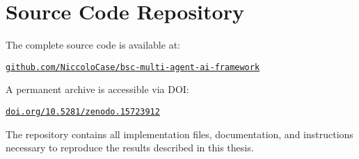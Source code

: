 \section*{Source Code Repository}
\noindent The complete source code is available at:
\begin{center}
\href{https://github.com/NiccoloCase/bsc-multi-agent-ai-framework}{\texttt{github.com/NiccoloCase/bsc-multi-agent-ai-framework}}
\end{center}

\noindent A permanent archive is accessible via DOI:
\begin{center}
\href{https://doi.org/10.5281/zenodo.15723912}{\texttt{doi.org/10.5281/zenodo.15723912}}
\end{center}

\noindent The repository contains all implementation files, documentation, and instructions necessary to reproduce the results described in this thesis.